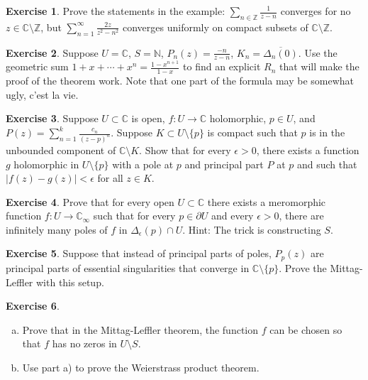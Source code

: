 \documentclass[12pt,openany]{book}
\newcommand{\sabs}[1]{\lvert {#1} \rvert}
\newcommand{\C}{{\mathbb{C}}}
\newcommand{\Z}{{\mathbb{Z}}}
\newcommand{\N}{{\mathbb{N}}}
\theoremstyle{plain}
\theoremstyle{remark}
\theoremstyle{definition}
\newenvironment{exbox}{%
    \def\FrameCommand{\vrule width 1pt \relax\hspace{10pt}}%
    \MakeFramed{\advance\hsize-\width\FrameRestore}%
}{%
    \endMakeFramed
}
\newenvironment{exparts}{%
    \leavevmode\begin{enumerate}[a),noitemsep,topsep=0pt,parsep=0pt,partopsep=0pt]
}{%
    \end{enumerate}
}
\theoremstyle{exercise}
\newtheorem{exercise}{Exercise}[section]
\theoremstyle{example}
\begin{document}
\begin{exbox}
\begin{exercise}
Prove the statements in the example: 
$\sum_{n\in \Z} \frac{1}{z-n}$
converges for no $z \in \C \setminus \Z$, but
$\sum_{n=1}^\infty
\frac{2z}{z^2-n^2}$
converges uniformly on compact subsets of $\C \setminus \Z$.
\end{exercise}

\begin{exercise}
Suppose $U = \C$, $S = \N$, $P_n(z) = \frac{-n}{z-n}$, $K_n =
\overline{\Delta_n(0)}$.  Use the geometric sum $1+x+\cdots+x^n =
\frac{1-x^{n+1}}{1-x}$ to find an explicit $R_n$ that will make the proof
of the theorem work.
Note that one part of the formula may be somewhat ugly, c'est la vie.
\end{exercise}

\begin{exercise}
Suppose $U \subset \C$ is open, $f \colon U \to \C$ holomorphic,
$p \in U$, and
$P(z) = \sum_{n=1}^{k} \frac{c_n}{{(z-p)}^n}$.
Suppose
$K \subset U \setminus \{ p \}$ is compact such that $p$ is in the unbounded
component of $\C \setminus K$.  Show that for every $\epsilon > 0$,
there exists a function $g$ holomorphic in $U \setminus \{ p \}$
with a pole at $p$ and principal part $P$ at $p$ and such that
$\sabs{f(z)-g(z)} < \epsilon$ for all $z \in K$.
\end{exercise}

\begin{exercise}
Prove that for every open $U \subset \C$ there exists a meromorphic function
$f \colon U \to \C_\infty$ such that for every $p \in \partial U$
and every $\epsilon > 0$, there are infinitely many poles of $f$ in
$\Delta_{\epsilon}(p) \cap U$.  Hint: The trick is constructing $S$.
\end{exercise}

\begin{exercise}
Suppose that instead of principal parts of poles, $P_p(z)$ are principal
parts of essential singularities that converge in $\C \setminus \{ p \}$.
Prove the Mittag-Leffler with this setup.
\end{exercise}

\begin{exercise}
\begin{exparts}
\item
Prove that in the Mittag-Leffler theorem, the function $f$ can be chosen
so that $f$ has no zeros in $U \setminus S$.
\item
Use part a) to prove the Weierstrass product theorem.
\end{exparts}
\end{exercise}
\end{exbox}
\end{document}
